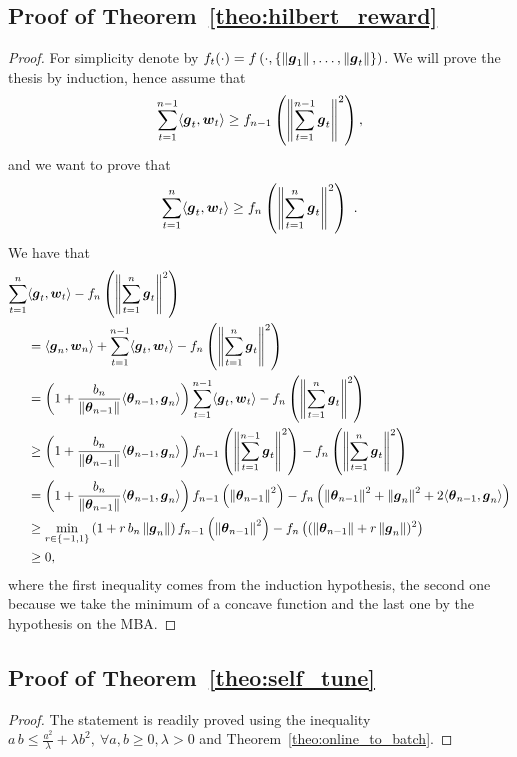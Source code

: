 \subsection{Proof of Theorem~\ref{theo:hilbert_reward}}
\begin{proof}
  For simplicity denote by $f_t(\cdot)=f\left(\cdot, \{\left\|{\boldsymbol{g}_1}\right\|, \ldots, \left\|{\boldsymbol{g}_t}\right\|\}\right)$.
  We will prove the thesis by induction, hence assume that 
  \[
  \sum_{t=1}^{n-1} \langle \boldsymbol{g}_t, \boldsymbol{w}_t \rangle \geq f_{n-1}\left( \left\|{\sum_{t=1}^{n-1} \boldsymbol{g}_t}\right\|^2\right),
  \]
  and we want to prove that 
  \[
  \sum_{t=1}^{n} \langle \boldsymbol{g}_t, \boldsymbol{w}_t \rangle \geq f_{n}\left( \left\|{\sum_{t=1}^{n} \boldsymbol{g}_t}\right\|^2\right)~.
  \]
  We have that
  \begin{align*}
  \sum_{t=1}^{n} &\langle \boldsymbol{g}_t, \boldsymbol{w}_t \rangle - f_n\left( \left\|{\sum_{t=1}^{n} \boldsymbol{g}_t}\right\|^2\right) \\
  &= \langle \boldsymbol{g}_n, \boldsymbol{w}_n \rangle + \sum_{t=1}^{n-1} \langle \boldsymbol{g}_t, \boldsymbol{w}_t \rangle - f_n\left( \left\|{\sum_{t=1}^{n} \boldsymbol{g}_t}\right\|^2\right)\\
  &= \left(1+\frac{b_n}{\left\|{{\boldsymbol{\theta}}_{n-1}}\right\|}\langle {\boldsymbol{\theta}}_{n-1},\boldsymbol{g}_n \rangle \right)\sum_{t=1}^{n-1} \langle \boldsymbol{g}_t, \boldsymbol{w}_t \rangle - f_n\left( \left\|{\sum_{t=1}^{n} \boldsymbol{g}_t}\right\|^2\right)\\
  &\geq \left(1+\frac{b_n}{\left\|{{\boldsymbol{\theta}}_{n-1}}\right\|}\langle {\boldsymbol{\theta}}_{n-1},\boldsymbol{g}_n \rangle \right) f_{n-1}\left( \left\|{\sum_{t=1}^{n-1} \boldsymbol{g}_t}\right\|^2\right) - f_n\left( \left\|{\sum_{t=1}^{n} \boldsymbol{g}_t}\right\|^2\right)\\
  &= \left(1+\frac{b_n}{\left\|{{\boldsymbol{\theta}}_{n-1}}\right\|}\langle {\boldsymbol{\theta}}_{n-1},\boldsymbol{g}_n \rangle \right) f_{n-1}\left( \left\|{{\boldsymbol{\theta}}_{n-1}}\right\|^2\right) - f_n\left( \left\|{{\boldsymbol{\theta}}_{n-1}}\right\|^2 + \left\|{\boldsymbol{g}_n}\right\|^2 + 2 \langle {\boldsymbol{\theta}}_{n-1}, \boldsymbol{g}_n \rangle \right)\\
  &\geq \min_{r\in \{-1,1\}} \left(1+ r\, b_n \left\|{\boldsymbol{g}_n}\right\| \right) f_{n-1}\left( \left\|{{\boldsymbol{\theta}}_{n-1}}\right\|^2\right) - f_n\left(( \left\|{{\boldsymbol{\theta}}_{n-1}}\right\| + r \left\|{\boldsymbol{g}_n}\right\|)^2\right)\\
  &\geq 0,
  \end{align*}
  where the first inequality comes from the induction hypothesis, the second one because we take the minimum of a concave function and the last one by the hypothesis on the \ac{MBA}.
\end{proof}


\subsection{Proof of Theorem~\ref{theo:self_tune}}
\begin{proof}
The statement is readily proved using the inequality $a\,b \leq \frac{a^2}{\lambda} + \lambda b^2, \ \forall a,b\geq0, \lambda>0$ and Theorem~\ref{theo:online_to_batch}.
\end{proof}

